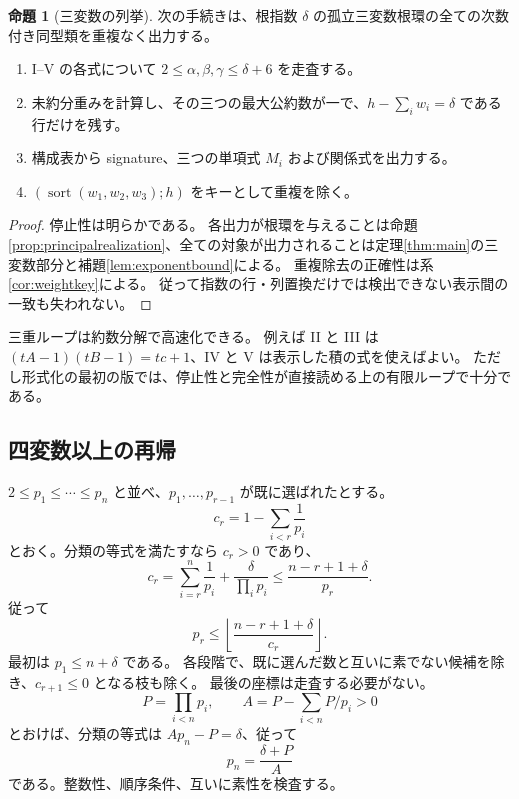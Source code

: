 \documentclass[11pt,a4paper]{ltjsarticle}
\numberwithin{equation}{section}
\theoremstyle{definition}
\newtheorem{proposition}[theorem]{命題}
\begin{document}
\begin{proposition}[三変数の列挙]\label{prop:algorithm3}
次の手続きは、根指数 $\delta$ の孤立三変数根環の全ての次数付き同型類を重複なく出力する。
\begin{enumerate}
\item I--V の各式について $2\le\alpha,\beta,\gamma\le\delta+6$ を走査する。
\item 未約分重みを計算し、その三つの最大公約数が一で、$h-\sum_iw_i=\delta$ である行だけを残す。
\item 構成表から signature、三つの単項式 $M_i$ および関係式を出力する。
\item $(\operatorname{sort}(w_1,w_2,w_3);h)$ をキーとして重複を除く。
\end{enumerate}
\end{proposition}
\begin{proof}
停止性は明らかである。
各出力が根環を与えることは命題\ref{prop:principalrealization}、全ての対象が出力されることは定理\ref{thm:main}の三変数部分と補題\ref{lem:exponentbound}による。
重複除去の正確性は系\ref{cor:weightkey}による。
従って指数の行・列置換だけでは検出できない表示間の一致も失われない。
\end{proof}
三重ループは約数分解で高速化できる。
例えば II と III は $(tA-1)(tB-1)=tc+1$、IV と V は表示した積の式を使えばよい。
ただし形式化の最初の版では、停止性と完全性が直接読める上の有限ループで十分である。

\subsection{四変数以上の再帰}
$2\le p_1\le\cdots\le p_n$ と並べ、$p_1,\dots,p_{r-1}$ が既に選ばれたとする。
\[
 c_r=1-\sum_{i<r}\frac1{p_i}
\]
とおく。分類の等式を満たすなら $c_r>0$ であり、
\[
 c_r=\sum_{i=r}^n\frac1{p_i}+\frac\delta{\prod_i p_i}
 \le\frac{n-r+1+\delta}{p_r}.
\]
従って
\begin{equation}\label{eq:recursivebound}
 p_r\le\left\lfloor\frac{n-r+1+\delta}{c_r}\right\rfloor.
\end{equation}
最初は $p_1\le n+\delta$ である。
各段階で、既に選んだ数と互いに素でない候補を除き、$c_{r+1}\le0$ となる枝も除く。
最後の座標は走査する必要がない。
\[
 P=\prod_{i<n}p_i,\qquad A=P-\sum_{i<n}P/p_i>0
\]
とおけば、分類の等式は $Ap_n-P=\delta$、従って
\begin{equation}\label{eq:lastcoordinate}
 p_n=\frac{\delta+P}{A}
\end{equation}
である。整数性、順序条件、互いに素性を検査する。
\end{document}
